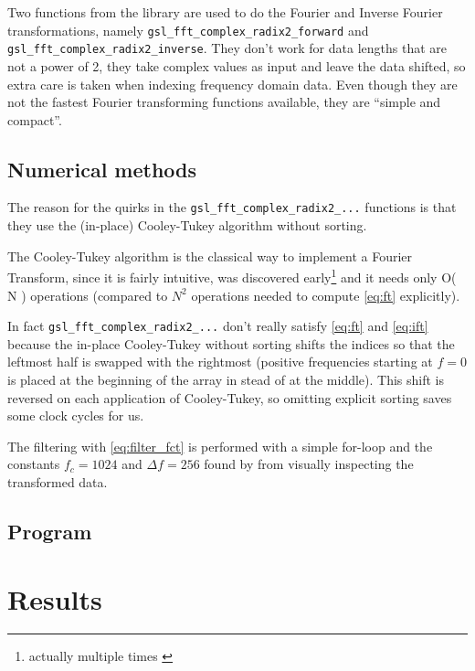 \documentclass[12pt,a4paper]{article}
\newcommand{\ordo}[1]{{\cal O}\left( #1 \right)}
\begin{document}
Two functions from the \Gsl library are used to do the Fourier and Inverse
Fourier transformations, namely \texttt{gsl\_fft\_complex\_radix2\_forward}
and \texttt{gsl\_fft\_complex\_radix2\_inverse}.
They don't work for data lengths that are not a power of 2,
they take complex values as input and leave the data shifted, so extra care is
taken when indexing frequency domain data.
Even though they are not the fastest Fourier transforming functions available,
they are ``simple and compact''\cite{gsl_doc}.

\subsection{Numerical methods}\label{sec:nm}
The reason for the quirks in the \texttt{gsl\_fft\_complex\_radix2\_...}
functions is that they use the (in-place) Cooley-Tukey algorithm without sorting.

The Cooley-Tukey algorithm is the classical way to implement a Fourier Transform,
since it is fairly intuitive, was discovered early\footnote{actually multiple times \cite{cooley_tukey}}
and it needs only \ordo{N} operations (compared to $N^2$ operations needed to
compute \eqref{eq:ft} explicitly).

In fact \texttt{gsl\_fft\_complex\_radix2\_...} don't really satisfy \eqref{eq:ft} and \eqref{eq:ift}
because the in-place Cooley-Tukey without sorting shifts the indices
so that the leftmost half is swapped with the rightmost (positive frequencies
starting at $f=0$ is placed at the beginning of the array in stead of at the middle).
This shift is reversed on each application of Cooley-Tukey, so omitting explicit
sorting saves some clock cycles for us.

The filtering with \eqref{eq:filter_fct} is performed with a simple for-loop
and the constants $f_c = 1024$ and $\Delta f = 256$ found by from visually
inspecting the transformed data.

\subsection{Program}

\section{Results}\label{sec:results}
\end{document}
